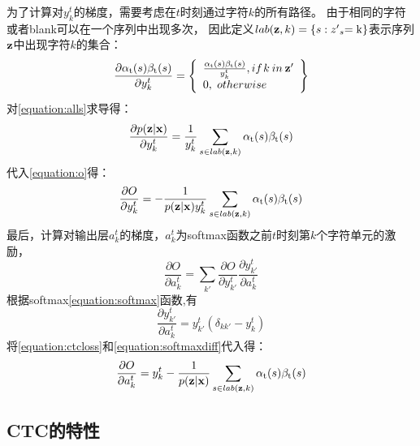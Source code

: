 为了计算对$y_k^t$的梯度，需要考虑在$t$时刻通过字符$k$的所有路径。
由于相同的字符或者blank可以在一个序列中出现多次，
因此定义$lab({\bf{z}},k) = \{ s:{{z'}_s}{\rm{ = k\} }}$表示序列$\bf{z}$中出现字符$k$的集合：
\begin{equation}
\frac{{\partial {\alpha _{\rm{t}}}(s){\beta _{\rm{t}}}(s)}}{{\partial y_k^t}} = \left\{ \begin{array}{l}
\frac{{{\alpha _{\rm{t}}}(s){\beta _{\rm{t}}}(s)}}{{y_k^t}},if{\kern 1pt} k{\kern 1pt} {\kern 1pt} in{\kern 1pt} {\kern 1pt} {\bf{z'}}\\
0,{\kern 1pt} {\kern 1pt} {\kern 1pt} otherwise
\end{array} \right\}
\end{equation}
对\ref{equation:alls}求导得：
\begin{equation}
\frac{{\partial p({\bf{z}}|{\bf{x}})}}{{\partial y_k^t}} = \frac{1}{{y_k^t}}\sum\limits_{s \in lab({\bf{z}},k)}^{} {{\alpha _{\rm{t}}}(s){\beta _{\rm{t}}}(s)}
\end{equation}
代入\ref{equation:o}得：
\begin{equation}
\label{equation:ctcloss}
\frac{{\partial O}}{{\partial y_k^t}} =  - \frac{1}{{p({\bf{z}}|{\bf{x}})y_k^t}}\sum\limits_{s \in lab({\bf{z}},k)}^{} {{\alpha _{\rm{t}}}(s){\beta _{\rm{t}}}(s)}
\end{equation}
最后，计算对输出层$a_k^t$的梯度，$a_k^t$为softmax函数之前$t$时刻第$k$个字符单元的激励，
\begin{equation}
\label{equation:alldiff}
\frac{{\partial O}}{{\partial a_k^t}} = \sum\limits_{k'} {\frac{{\partial O}}{{\partial y_{k'}^t}}} \frac{{\partial y_{k'}^t}}{{\partial a_k^t}}
\end{equation}
根据softmax\ref{equation:softmax}函数,有
\begin{equation}
\label{equation:softmaxdiff}
\frac{{\partial y_{k'}^t}}{{\partial a_k^t}} = y_{k'}^t({\delta _{kk'}} - y_k^t)
\end{equation}
将\ref{equation:ctcloss}和\ref{equation:softmaxdiff}代入\label{equation:alldiff}得：
\begin{equation}
\frac{{\partial O}}{{\partial a_k^t}} = y_k^t - \frac{1}{{p({\bf{z}}|{\bf{x}})}}\sum\limits_{s \in lab({\bf{z}},k)}^{} {{\alpha _{\rm{t}}}(s){\beta _{\rm{t}}}(s)}
\end{equation}

\subsection{CTC的特性}

